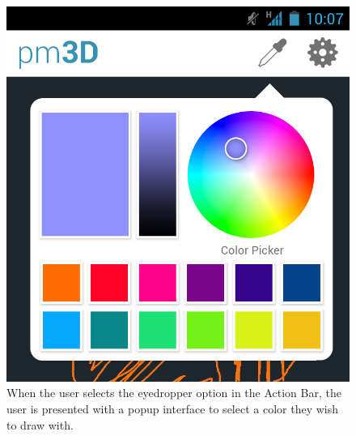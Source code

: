\documentclass{chi-ext}
\begin{document}
\begin{figure}
\hspace{\columnwidth}%
\parbox{\columnwidth}{
  \centering
  \includegraphics[width=\columnwidth]{colorpicker.jpg}
  \caption{When the user selects the eyedropper option in the Action Bar, the user is presented with a popup interface to select a color they wish to draw with.}
  \label{fig:colorpicker}
}
\end{figure}


\end{document}
